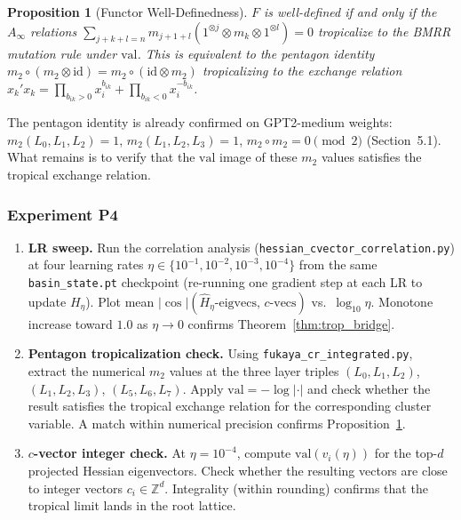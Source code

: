 \documentclass[11pt]{amsart}
\newtheorem{proposition}[theorem]{Proposition}
\begin{document}
\begin{proposition}[Functor Well-Definedness]
\label{prop:functor}
$F$ is well-defined if and only if the $A_\infty$ relations
$\sum_{j+k+l=n} m_{j+1+l}(1^{\otimes j}\otimes m_k \otimes 1^{\otimes l}) = 0$
tropicalize to the BMRR mutation rule under $\mathrm{val}$.
This is equivalent to the pentagon identity
$m_2 \circ (m_2 \otimes \mathrm{id}) = m_2 \circ (\mathrm{id} \otimes m_2)$
tropicalizing to the exchange relation
$x_k' x_k = \prod_{b_{ik}>0} x_i^{b_{ik}} + \prod_{b_{ik}<0} x_i^{-b_{ik}}$.
\end{proposition}

The pentagon identity is already confirmed on GPT2-medium weights:
$m_2(L_0,L_1,L_2) = 1$, $m_2(L_1,L_2,L_3) = 1$,
$m_2 \circ m_2 = 0 \pmod{2}$ (Section~5.1).
What remains is to verify that the $\mathrm{val}$ image of these
$m_2$ values satisfies the tropical exchange relation.

\subsubsection*{Experiment P4}

\begin{enumerate}
\item \textbf{LR sweep.}
  Run the correlation analysis
  (\texttt{hessian\_cvector\_correlation.py}) at four learning rates
  $\eta \in \{10^{-1}, 10^{-2}, 10^{-3}, 10^{-4}\}$
  from the same \texttt{basin\_state.pt} checkpoint
  (re-running one gradient step at each LR to update $H_\eta$).
  Plot mean $|\cos|(\hat{H}_\eta\text{-eigvecs},\, c\text{-vecs})$
  vs.\ $\log_{10}\eta$.
  Monotone increase toward $1.0$ as $\eta\to 0$ confirms
  Theorem~\ref{thm:trop_bridge}.

\item \textbf{Pentagon tropicalization check.}
  Using \texttt{fukaya\_cr\_integrated.py}, extract the numerical
  $m_2$ values at the three layer triples
  $(L_0,L_1,L_2)$, $(L_1,L_2,L_3)$, $(L_5,L_6,L_7)$.
  Apply $\mathrm{val} = -\log|\cdot|$ and check whether the result
  satisfies the tropical exchange relation for the corresponding
  cluster variable.
  A match within numerical precision confirms
  Proposition~\ref{prop:functor}.

\item \textbf{$c$-vector integer check.}
  At $\eta = 10^{-4}$, compute $\mathrm{val}(v_i(\eta))$
  for the top-$d$ projected Hessian eigenvectors.
  Check whether the resulting vectors are close to integer
  vectors $c_i \in \mathbb{Z}^d$.
  Integrality (within rounding) confirms that the tropical limit
  lands in the root lattice.
\end{enumerate}
\end{document}
